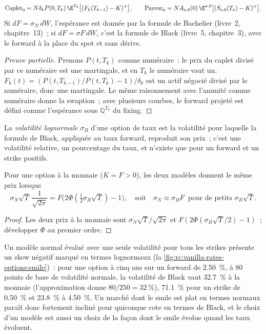 \begin{proposition}\label{prop:rc:vanilla-rates-options:measures}
\[
\mathrm{Caplet}_0 = N\delta_kP(0,T_k)\,\E^{T_k}\bigl[(F_k(T_{k-1})-K)^+\bigr],
\qquad
\mathrm{Payeur}_0 = N A_{a,b}(0)\,\E^{a,b}\bigl[(S_{a,b}(T_a)-K)^+\bigr].
\]
Si $dF = \sigma_N\,dW$, l'espérance est donnée par la formule de Bachelier (livre~2,
chapitre~13)~; si $dF = \sigma F\,dW$, c'est la formule de Black (livre~5,
chapitre~3), avec le forward à la place du spot et sans dérive.
\end{proposition}
\begin{proof}[Preuve partielle]
Prenons $P(t,T_k)$ comme numéraire~: le prix du caplet divisé par ce numéraire est une martingale,
et en $T_k$ le numéraire vaut un. $F_k(t) = (P(t,T_{k-1})/P(t,T_k)-1)/\delta_k$
est un actif négocié divisé par le numéraire, donc une martingale. Le même
raisonnement avec l'annuité comme numéraire donne la swaption~; avec plusieurs courbes,
le forward projeté est défini comme l'espérance sous $\mathbb Q^{T_k}$ du
fixing.
\end{proof}

\begin{definition}\label{def:rc:vanilla-rates-options:lognormal}
La \emph{volatilité lognormale} $\sigma_B$ d'une
option de taux est la volatilité pour laquelle la formule de Black, appliquée au
taux forward, reproduit son prix~; c'est une volatilité relative, un pourcentage
du taux, et n'existe que pour un forward et un strike positifs.
\end{definition}

\begin{proposition}\label{prop:rc:vanilla-rates-options:atm}
Pour une option à la monnaie ($K=F>0$), les deux modèles donnent le même prix lorsque
\[
\sigma_N\sqrt{T}\,\frac{1}{\sqrt{2\pi}} = F\bigl(2\Phi(\tfrac12\sigma_B\sqrt T)-1\bigr),
\quad\text{soit}\quad
\sigma_N \approx \sigma_B F \ \text{ pour de petits }\sigma_B\sqrt T.
\]
\end{proposition}
\begin{proof}
Les deux prix à la monnaie sont $\sigma_N\sqrt{T}/\sqrt{2\pi}$ et
$F(2\Phi(\sigma_B\sqrt T/2)-1)$~; développer $\Phi$ au premier ordre.
\end{proof}

Un modèle normal évalué avec une seule volatilité pour tous les strikes présente un skew négatif
marqué en termes lognormaux (la \cref{fig:rc:vanilla-rates-options:smile})~: pour une
option à cinq ans sur un forward de 2.50~\%, à 80 points de base de
volatilité normale, la volatilité de Black vaut 32.7~\% à la monnaie (l'approximation
donne $80/250 = 32~\%$), 71.1~\% pour un strike de 0.50~\% et 23.8~\% à 4.50~\%. Un
marché dont le smile est plat en termes normaux paraît donc fortement incliné pour
quiconque cote en termes de Black, et le choix d'un modèle est aussi un choix de la façon dont le
smile évolue quand les taux évoluent.

